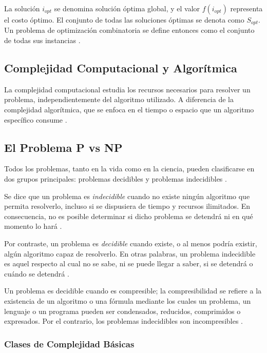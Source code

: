 \documentclass[12pt,titlepage,twoside,openright]{book}
\begin{document}
La solución \(i_{opt}\) se denomina solución óptima global, y el valor \(f(i_{opt})\) representa el costo óptimo. El conjunto de todas las soluciones óptimas se denota como \(S_{opt}\). Un problema de optimización combinatoria se define entonces como el conjunto de todas sus instancias \citep{cobos2010}.



\subsection{Complejidad Computacional y Algorítmica}

La complejidad computacional estudia los recursos necesarios para resolver un problema, independientemente del algoritmo utilizado. A diferencia de la complejidad algorítmica, que se enfoca en el tiempo o espacio que un algoritmo específico consume \citep{maldonado2013problema}.

\subsection{El Problema P vs NP}

Todos los problemas, tanto en la vida como en la ciencia, pueden clasificarse en dos grupos principales: problemas decidibles y problemas indecidibles \citep{maldonado2013problema}.

Se dice que un problema es \emph{indecidible} cuando no existe ningún algoritmo que permita resolverlo, incluso si se dispusiera de tiempo y recursos ilimitados. En consecuencia, no es posible determinar si dicho problema se detendrá ni en qué momento lo hará \citep{maldonado2013problema}.

Por contraste, un problema es \emph{decidible} cuando existe, o al menos podría existir, algún algoritmo capaz de resolverlo. En otras palabras, un problema indecidible es aquel respecto al cual no se sabe, ni se puede llegar a saber, si se detendrá o cuándo se detendrá \citep{maldonado2013problema}.

Un problema es decidible cuando es compresible; la compresibilidad se refiere a la existencia de un algoritmo o una fórmula mediante los cuales un problema, un lenguaje o un programa pueden ser condensados, reducidos, comprimidos o expresados. Por el contrario, los problemas indecidibles son incompresibles \citep{maldonado2013problema}.

\subsubsection{Clases de Complejidad Básicas}
\end{document}
